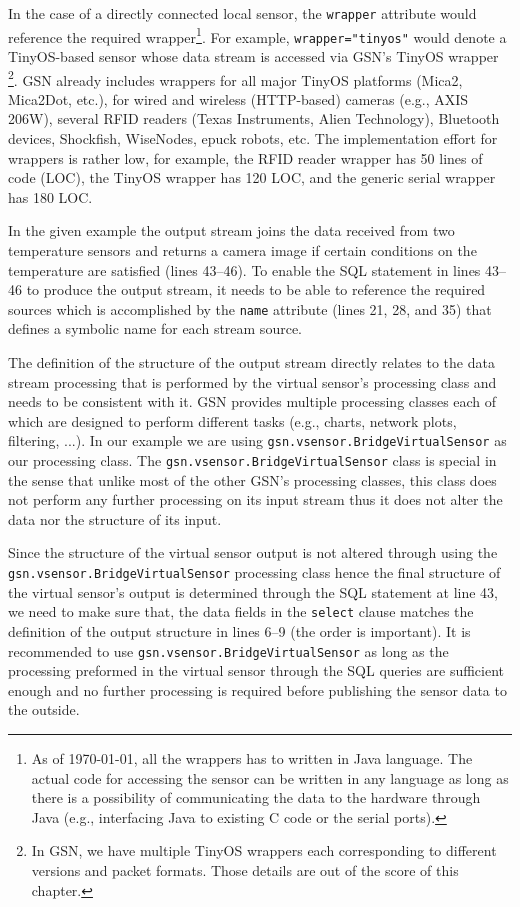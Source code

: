 In the case of a directly connected local sensor, the \verb|wrapper| attribute would reference the required wrapper\footnote{As of \today, all the wrappers has to written in Java language. The actual code for accessing the sensor can be written in any language as long as there is a possibility of communicating the data to the hardware
through Java (e.g., interfacing Java to existing C code or the serial ports).}.
For example, \verb|wrapper="tinyos"| would denote a TinyOS-based sensor whose data
stream is accessed via GSN's TinyOS wrapper \footnote{In GSN, we have multiple TinyOS wrappers each corresponding to different
versions and packet formats. Those details are out of the score of this chapter.}.
GSN already includes wrappers for all major TinyOS platforms (Mica2, Mica2Dot, etc.), for wired and wireless
(HTTP-based) cameras (e.g., AXIS 206W), several RFID readers (Texas
Instruments, Alien Technology), Bluetooth devices, Shockfish, WiseNodes, epuck
robots, etc. The implementation effort for wrappers is rather low, for example,
the RFID reader wrapper has 50 lines of code (LOC), the TinyOS wrapper has 120
LOC, and the generic serial wrapper has 180 LOC.

In the given example the output stream joins the data received from two
temperature sensors and returns a camera image if certain conditions on the
temperature are satisfied (lines 43--46). To enable the SQL statement in lines
43--46 to produce the output stream, it needs to be able to reference the
required sources which is accomplished by the \verb|name| attribute
(lines 21, 28, and 35) that defines a symbolic name for each stream source.

The definition of the structure of the output stream directly relates to the data
stream processing that is performed by the virtual sensor's processing class and needs to be
consistent with it. GSN provides multiple processing classes each of which are designed
to perform different tasks (e.g., charts, network plots, filtering, ...). In our example we are using
\texttt{gsn.vsensor.BridgeVirtualSensor} as our processing class. The \texttt{gsn.vsensor.BridgeVirtualSensor}
class is special in the sense that unlike most of the other GSN's processing classes, this class does not
perform any further processing on its input stream thus it does not alter the data nor the structure of its input.

Since the structure of the virtual sensor output is not altered through using the \texttt{gsn.vsensor.BridgeVirtualSensor} processing class hence the final
structure of the virtual sensor's output is determined through the SQL statement at line 43, we need to make sure that,
the data fields in the \verb|select| clause matches the definition of the output structure in lines 6--9 (the order is important).
It is recommended to use \texttt{gsn.vsensor.BridgeVirtualSensor} as long as the processing preformed in the virtual
sensor through the SQL queries are sufficient enough and no further processing is required before publishing the sensor 
data to the outside.

